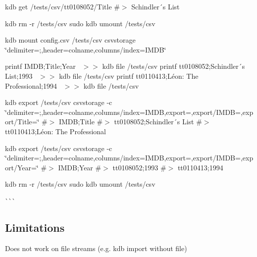 kdb get /tests/csv/tt0108052/\+Title \#$>$ Schindler´s List

kdb rm -\/r /tests/csv sudo kdb umount /tests/csv


\begin{DoxyCode}{0}
\end{DoxyCode}
 kdb mount config.\+csv /tests/csv csvstorage \char`\"{}delimiter=;,header=colname,columns/index=\+I\+M\+D\+B\char`\"{}

printf \textquotesingle{}I\+M\+DB;Title;Year~\newline
\textquotesingle{} $>$$>$ {\ttfamily kdb file /tests/csv} printf \textquotesingle{}tt0108052;Schindler´s List;1993~\newline
\textquotesingle{} $>$$>$ {\ttfamily kdb file /tests/csv} printf \textquotesingle{}tt0110413;Léon\+: The Professional;1994~\newline
\textquotesingle{} $>$$>$ {\ttfamily kdb file /tests/csv}

kdb export /tests/csv csvstorage -\/c \char`\"{}delimiter=;,header=colname,columns/index=\+I\+M\+D\+B,export=,export/\+I\+M\+D\+B=,export/\+Title=\char`\"{} \#$>$ I\+M\+DB;Title \#$>$ tt0108052;Schindler´s List \#$>$ tt0110413;Léon\+: The Professional

kdb export /tests/csv csvstorage -\/c \char`\"{}delimiter=;,header=colname,columns/index=\+I\+M\+D\+B,export=,export/\+I\+M\+D\+B=,export/\+Year=\char`\"{} \#$>$ I\+M\+DB;Year \#$>$ tt0108052;1993 \#$>$ tt0110413;1994

kdb rm -\/r /tests/csv sudo kdb umount /tests/csv

\`{}\`{}\`{}\hypertarget{autotoc_md126_autotoc_md149}{}\subsection{Limitations}\label{autotoc_md126_autotoc_md149}

\begin{DoxyItemize}
\item Does not work on file streams (e.\+g. {\ttfamily kdb import} without file) 
\end{DoxyItemize}